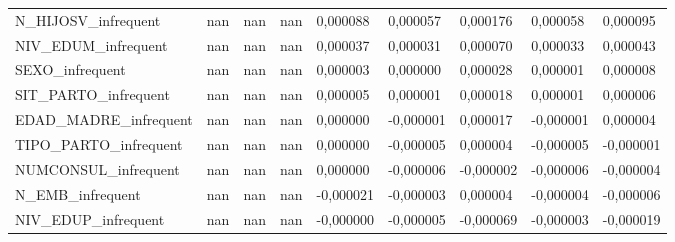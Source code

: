 \begin{tabular}{lllllllll}
N\_HIJOSV\_infrequent & nan & nan & nan & 0{,}000088 & 0{,}000057 & 0{,}000176 & 0{,}000058 & 0{,}000095 \\
NIV\_EDUM\_infrequent & nan & nan & nan & 0{,}000037 & 0{,}000031 & 0{,}000070 & 0{,}000033 & 0{,}000043 \\
SEXO\_infrequent & nan & nan & nan & 0{,}000003 & 0{,}000000 & 0{,}000028 & 0{,}000001 & 0{,}000008 \\
SIT\_PARTO\_infrequent & nan & nan & nan & 0{,}000005 & 0{,}000001 & 0{,}000018 & 0{,}000001 & 0{,}000006 \\
EDAD\_MADRE\_infrequent & nan & nan & nan & 0{,}000000 & -0{,}000001 & 0{,}000017 & -0{,}000001 & 0{,}000004 \\
TIPO\_PARTO\_infrequent & nan & nan & nan & 0{,}000000 & -0{,}000005 & 0{,}000004 & -0{,}000005 & -0{,}000001 \\
NUMCONSUL\_infrequent & nan & nan & nan & 0{,}000000 & -0{,}000006 & -0{,}000002 & -0{,}000006 & -0{,}000004 \\
N\_EMB\_infrequent & nan & nan & nan & -0{,}000021 & -0{,}000003 & 0{,}000004 & -0{,}000004 & -0{,}000006 \\
NIV\_EDUP\_infrequent & nan & nan & nan & -0{,}000000 & -0{,}000005 & -0{,}000069 & -0{,}000003 & -0{,}000019 \\
\bottomrule
\end{tabular}
